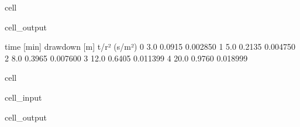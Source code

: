 \documentclass[letterpaper,10pt,english]{jupyterBook}
\begin{document}
\begin{sphinxuseclass}{cell}
\begin{sphinxVerbatimOutput}
\begin{sphinxuseclass}{cell_output}
\begin{sphinxVerbatim}[commandchars=\\\{\}]
   time [min]  drawdown [m]  t/r² (s/m²)
0         3.0        0.0915     0.002850
1         5.0        0.2135     0.004750
2         8.0        0.3965     0.007600
3        12.0        0.6405     0.011399
4        20.0        0.9760     0.018999
\end{sphinxVerbatim}

\end{sphinxuseclass}\end{sphinxVerbatimOutput}

\end{sphinxuseclass}
\begin{sphinxuseclass}{cell}\begin{sphinxVerbatimInput}

\begin{sphinxuseclass}{cell_input}
\begin{sphinxVerbatim}[commandchars=\\\{\}]


   
  


  
\end{sphinxVerbatim}

\end{sphinxuseclass}\end{sphinxVerbatimInput}
\begin{sphinxVerbatimOutput}

\begin{sphinxuseclass}{cell_output}
\noindent{}

\end{sphinxuseclass}\end{sphinxVerbatimOutput}

\end{sphinxuseclass}
\end{document}
